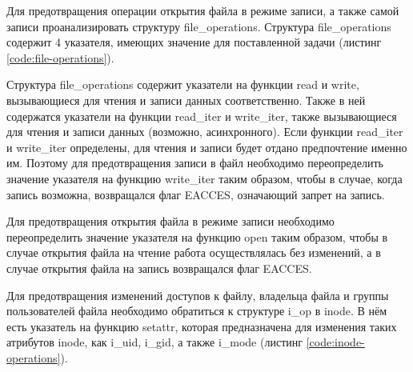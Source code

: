 
\clearpage

Для предотвращения операции открытия файла в режиме записи, а также самой записи проанализировать структуру file\_operations. Структура \linebreak file\_operations содержит 4 указателя, имеющих значение для поставленной задачи (листинг \ref{code:file-operations}).


Структура file\_operations содержит указатели на функции read и write, вызывающиеся для чтения и записи данных соответственно. Также в ней содержатся указатели на функции read\_iter и write\_iter, также вызывающиеся для чтения и записи данных (возможно, асинхронного). Если функции read\_iter и write\_iter определены, для чтения и записи будет отдано предпочтение именно им. Поэтому для предотвращения записи в файл необходимо переопределить значение указателя на функцию write\_iter таким образом, чтобы в случае, когда запись возможна, возвращался флаг \linebreak EACCES, означающий запрет на запись.

Для предотвращения открытия файла в режиме записи необходимо переопределить значение указателя на функцию open таким образом, чтобы в случае открытия файла на чтение работа осуществлялась без изменений, а в случае открытия файла на запись возвращался флаг EACCES.

Для предотвращения изменений доступов к файлу, владельца файла и группы пользователей файла необходимо обратиться к структуре i\_op в inode. В нём есть указатель на функцию setattr, которая предназначена для изменения таких атрибутов inode, как i\_uid, i\_gid, а также i\_mode (листинг \ref{code:inode-operations}).

